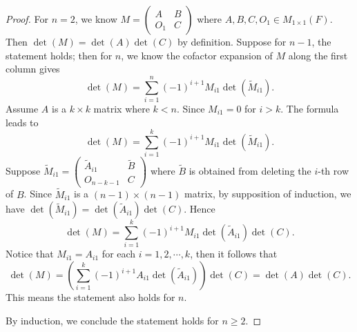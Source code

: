 \begin{Exercise}
	\begin{proof}
		For $n=2$, we know $M = \begin{pmatrix}
		A & B \\
		O_1 & C
		\end{pmatrix}$ where $A,B,C,O_1\in M_{1\times 1}(F)$. Then $\det(M) = \det(A)\det(C)$ by definition. Suppose for $n-1$, the statement holds; then for $n$, we know the cofactor expansion of $M$ along the first column gives
		$$
		\det(M) = \sum_{i=1}^{n}(-1)^{i+1} M_{i 1} \det(\tilde{M}_{i 1}).
		$$
		Assume $A$ is a $k\times k$ matrix where $k<n$. Since $M_{i 1} = 0$ for $i>k$. The formula leads to
		$$
		\det(M) = \sum_{i=1}^{k}(-1)^{i+1} M_{i 1} \det(\tilde{M}_{i 1}).
		$$
		Suppose
		$
		\tilde{M}_{i 1} = \begin{pmatrix}
		\tilde{A}_{i 1} & \tilde{B} \\
		O_{n-k-1} & C
		\end{pmatrix}
		$
		where $\tilde{B}$ is obtained from deleting the $i$-th row of $B$. Since $\tilde{M}_{i 1}$ is a $(n-1)\times(n-1)$ matrix, by supposition of induction, we have $\det(\tilde{M}_{i 1}) = \det(\tilde{A}_{i 1})\det(C)$. Hence
		$$
		\det(M) = \sum_{i=1}^{k}(-1)^{i+1} M_{i 1} \det(\tilde{A}_{i 1})\det(C).
		$$
		Notice that $M_{i 1} = A_{i 1}$ for each $i=1,2,\cdots,k$, then it follows that
		$$
		\det(M) = \left(\sum_{i=1}^{k}(-1)^{i+1} A_{i 1} \det(\tilde{A}_{i 1}) \right)\det(C)
		= \det(A)\det(C).
		$$
		This means the statement also holds for $n$.
		
		By induction, we conclude the statement holds for $n\geq 2$.
	\end{proof}
\end{Exercise}